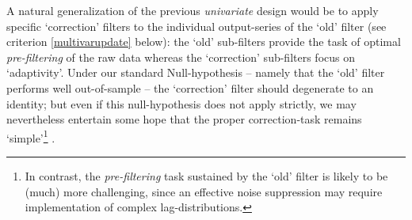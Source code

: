 \documentclass[11pt]{article}
\begin{document}
A natural generalization of the previous \emph{univariate} design would be to apply specific `correction' filters to the individual output-series of the `old' filter (see criterion \ref{multivarupdate} below): the `old' sub-filters provide the task of optimal \emph{pre-filtering} of the raw data whereas the `correction' sub-filters focus on `adaptivity'. Under our standard Null-hypothesis  -- namely that the `old' filter performs well out-of-sample -- the `correction' filter should degenerate to an identity; but even if this null-hypothesis does not apply strictly, we may nevertheless entertain some hope that the proper correction-task remains `simple'\footnote{In contrast, the \emph{pre-filtering} task sustained by the `old' filter is likely to be (much) more challenging, since an effective noise suppression may require implementation of  complex lag-distributions.}%
. \\

 
\end{document}
